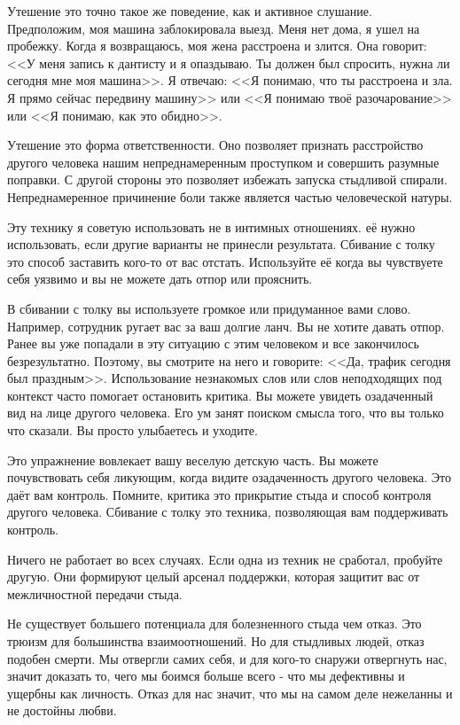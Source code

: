\documentclass[10pt, fleqn]{article}
\begin{document}
Утешение это точно такое же поведение, как и активное слушание. Предположим, моя машина заблокировала выезд. Меня нет дома, я ушел на пробежку. Когда я возвращаюсь, моя жена расстроена и злится. Она говорит: <<У меня запись к дантисту и я опаздываю. Ты должен был спросить, нужна ли сегодня мне моя машина>>. Я отвечаю: <<Я понимаю, что ты расстроена и зла. Я прямо сейчас передвину машину>> или <<Я понимаю твоё разочарование>> или <<Я понимаю, как это обидно>>.

Утешение это форма ответственности. Оно позволяет признать расстройство другого человека нашим непреднамеренным проступком и совершить разумные поправки. С другой стороны это позволяет избежать запуска стыдливой спирали. Непреднамеренное причинение боли также является частью человеческой натуры.



Эту технику я советую использовать не в интимных отношениях. её нужно использовать, если другие варианты не принесли результата. Сбивание с толку это способ заставить кого-то от вас отстать. Используйте её когда вы чувствуете себя уязвимо и вы не можете дать отпор или прояснить.

В сбивании с толку вы используете громкое или придуманное вами слово. Например, сотрудник ругает вас за ваш долгие ланч. Вы не хотите давать отпор. Ранее вы уже попадали в эту ситуацию с этим человеком и все закончилось безрезультатно. Поэтому, вы смотрите на него и говорите: <<Да, трафик сегодня был праздным>>. Использование незнакомых слов или слов неподходящих под контекст часто помогает остановить критика. Вы можете увидеть озадаченный вид на лице другого человека. Его ум занят поиском смысла того, что вы только что сказали. Вы просто улыбаетесь и уходите.

Это упражнение вовлекает вашу веселую детскую часть. Вы можете почувствовать себя ликующим, когда видите озадаченность другого человека. Это даёт вам контроль. Помните, критика это прикрытие стыда и способ контроля другого человека. Сбивание с толку это техника, позволяющая вам поддерживать контроль.

Ничего не работает во всех случаях. Если одна из техник не сработал, пробуйте другую. Они формируют целый арсенал поддержки, которая защитит вас от межличностной передачи стыда.


Не существует большего потенциала для болезненного стыда чем отказ. Это трюизм для большинства взаимоотношений. Но для стыдливых людей, отказ подобен смерти. Мы отвергли самих себя, и для кого-то снаружи отвергнуть нас, значит доказать то, чего мы боимся больше всего - что мы дефективны и ущербны как личность. Отказ для нас значит, что мы на самом деле нежеланны и не достойны любви.
\end{document}
